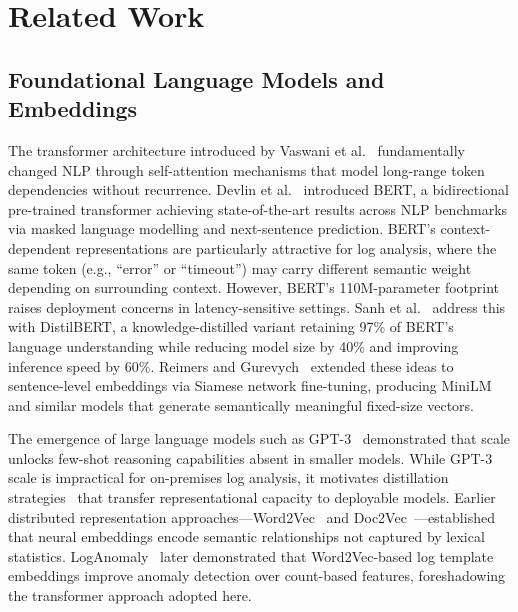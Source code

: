 \documentclass[conference]{IEEEtran}
\begin{document}
\section{Related Work}
\label{sec:related}

\subsection{Foundational Language Models and Embeddings}

The transformer architecture introduced by Vaswani et al.~\cite{vaswani2017}
fundamentally changed NLP through self-attention mechanisms that model
long-range token dependencies without recurrence.  Devlin et al.~\cite{devlin2019}
introduced BERT, a bidirectional pre-trained transformer achieving
state-of-the-art results across NLP benchmarks via masked language modelling
and next-sentence prediction.  BERT's context-dependent representations are
particularly attractive for log analysis, where the same token (e.g.,
``error'' or ``timeout'') may carry different semantic weight depending on
surrounding context.  However, BERT's 110M-parameter footprint raises
deployment concerns in latency-sensitive settings.  Sanh et al.~\cite{sanh2019}
address this with DistilBERT, a knowledge-distilled variant retaining 97\%
of BERT's language understanding while reducing model size by 40\% and
improving inference speed by 60\%.  Reimers and Gurevych~\cite{reimers2019}
extended these ideas to sentence-level embeddings via Siamese network
fine-tuning, producing MiniLM and similar models that generate
semantically meaningful fixed-size vectors.

The emergence of large language models such as GPT-3~\cite{brown2020}
demonstrated that scale unlocks few-shot reasoning capabilities absent in
smaller models.  While GPT-3 scale is impractical for on-premises log
analysis, it motivates distillation strategies~\cite{sanh2019} that transfer
representational capacity to deployable models.  Earlier distributed
representation approaches---Word2Vec~\cite{mikolov2013} and
Doc2Vec~\cite{le2014}---established that neural embeddings encode semantic
relationships not captured by lexical statistics.  LogAnomaly~\cite{meng2019}
later demonstrated that Word2Vec-based log template embeddings improve
anomaly detection over count-based features, foreshadowing the transformer
approach adopted here.
\end{document}
